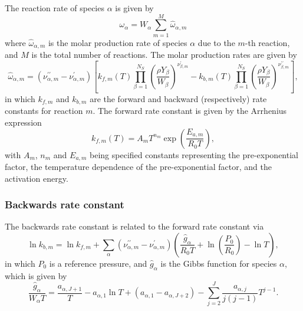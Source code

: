 \documentclass[notitlepage]{revtex4-1}
\begin{document}
The reaction rate of species $\alpha$ is given by
\begin{equation}\omega_{\alpha}=W_{\alpha}\displaystyle\sum_{m=1}^{M}\hat{\omega}_{\alpha,m}\end{equation}
where $\hat{\omega}_{\alpha,m}$ is the molar production rate of species $\alpha$ due to the $m$-th reaction, and $M$ is the total number of reactions. The molar production rates are given by
\begin{equation}\hat{\omega}_{\alpha,m}=\left(\nu^{\prime\prime}_{\alpha,m}-\nu^{\prime}_{\alpha,m}\right)\left[k_{f,m}\left(T\right)\displaystyle\prod_{\beta=1}^{N_{S}}\left(\frac{\rho{Y}_{\beta}}{W_{\beta}}\right)^{\nu^{\prime}_{\beta,m}}-k_{b,m}\left(T\right)\displaystyle\prod_{\beta=1}^{N_{S}}\left(\frac{\rho{Y}_{\beta}}{W_{\beta}}\right)^{\nu^{\prime\prime}_{\beta,m}}\right],\end{equation}
in which $k_{f,m}$ and $k_{b,m}$ are the forward and backward (respectively) rate constants for reaction $m$. The forward rate constant is given by the Arrhenius expression
\begin{equation}k_{f,m}\left(T\right)=A_{m}T^{n_{m}}\exp\left(\frac{E_{a,m}}{R_{0}T}\right),\end{equation}
with $A_{m}$, $n_{m}$ and $E_{a,m}$ being specified constants representing the pre-exponential factor, the temperature dependence of the pre-exponential factor, and the activation energy.

\subsubsection{Backwards rate constant}

The backwards rate constant is related to the forward rate constant via
\begin{equation}\ln{k}_{b,m}=\ln{k}_{f,m} + \displaystyle\sum_{\alpha}\left(\nu^{\prime\prime}_{\alpha,m}-\nu^{\prime}_{\alpha,m}\right)\left(\frac{\hat{g}_{\alpha}}{R_{0}T}+\ln\left(\frac{P_{0}}{R_{0}}\right)-\ln{T}\right),\end{equation}
in which $P_{0}$ is a reference pressure, and $\hat{g}_{\alpha}$ is the Gibbs function for species $\alpha$, which is given by
\begin{equation}\frac{\hat{g}_{\alpha}}{W_{\alpha}T}=\frac{a_{\alpha,J+1}}{T}-a_{\alpha,1}\ln{T}+\left(a_{\alpha,1}-a_{\alpha,J+2}\right)-\displaystyle\sum_{j=2}^{J}\frac{a_{\alpha,j}}{j\left(j-1\right)}T^{j-1}.\end{equation}
\end{document}
